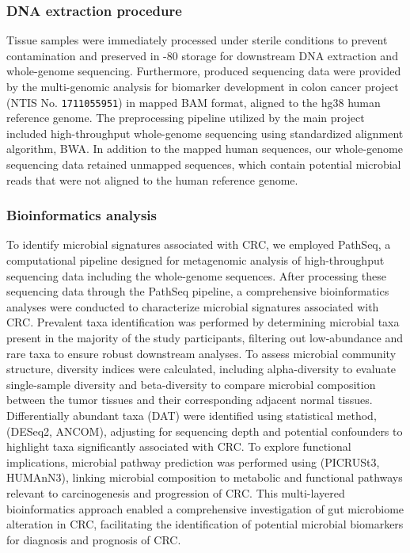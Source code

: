 \documentclass[11pt, a4paper, onecolumn, oneside]{report}
\begin{document}
            \subsubsection{DNA extraction procedure}
                Tissue samples were immediately processed under sterile conditions to prevent contamination and preserved in -80 \textcelsius storage for downstream DNA extraction and whole-genome sequencing. Furthermore, produced sequencing data were provided by the multi-genomic analysis for biomarker development in colon cancer project (NTIS No. \texttt{1711055951}) in mapped BAM format, aligned to the hg38 human reference genome. The preprocessing pipeline utilized by the main project included high-throughput whole-genome sequencing using standardized alignment algorithm, BWA. In addition to the mapped human sequences, our whole-genome sequencing data retained unmapped sequences, which contain potential microbial reads that were not aligned to the human reference genome.

            \subsubsection{Bioinformatics analysis}
                To identify microbial signatures associated with CRC, we employed PathSeq, a computational pipeline designed for metagenomic analysis of high-throughput sequencing data including the whole-genome sequences. After processing these sequencing data through the PathSeq pipeline, a comprehensive bioinformatics analyses were conducted to characterize microbial signatures associated with CRC. Prevalent taxa identification was performed by determining microbial taxa present in the majority of the study participants, filtering out low-abundance and rare taxa to ensure robust downstream analyses. To assess microbial community structure, diversity indices were calculated, including alpha-diversity to evaluate single-sample diversity and beta-diversity to compare microbial composition between the tumor tissues and their corresponding adjacent normal tissues. Differentially abundant taxa (DAT) were identified using statistical method, (DESeq2, ANCOM), adjusting for sequencing depth and potential confounders to highlight taxa significantly associated with CRC. To explore functional implications, microbial pathway prediction was performed using (PICRUSt3, HUMAnN3), linking microbial composition to metabolic and functional pathways relevant to carcinogenesis and progression of CRC. This multi-layered bioinformatics approach enabled a comprehensive investigation of gut microbiome alteration in CRC, facilitating the identification of potential microbial biomarkers for diagnosis and prognosis of CRC.
\end{document}
